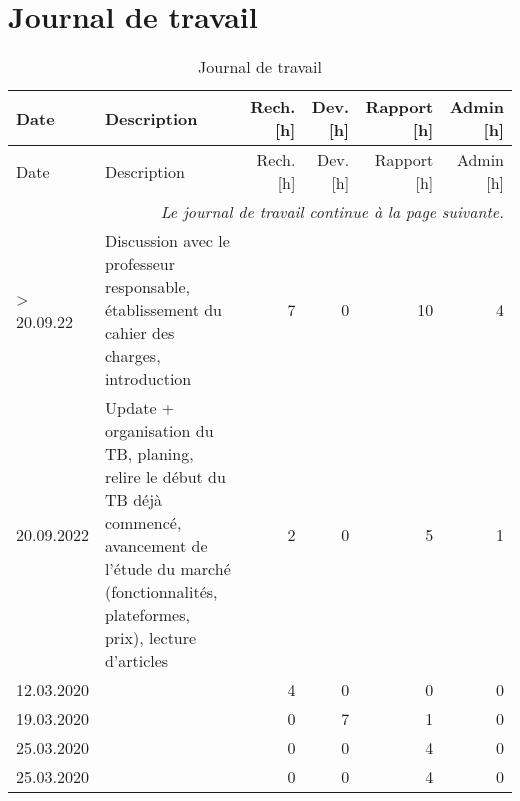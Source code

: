 

\chapter{Journal de travail}

\begin{landscape}

\begin{longtable}[c]{lp{10cm}rrrr}
    \caption{Journal de travail}\\

    \hline
    Date & Description & Rech. [h] & Dev. [h] & Rapport [h] & Admin [h] \\
    \hline
    \endfirsthead
    
    \hline
    Date & Description & Rech. [h] & Dev. [h] & Rapport [h] & Admin [h] \\
    \hline
    \endhead
    
    \multicolumn{6}{r}{\small \it Le journal de travail continue à la page suivante.} \\
    \normalsize
    \endfoot
    
    \hline
    \endlastfoot


    > 20.09.22
    & Discussion avec le professeur responsable, établissement du cahier des charges, introduction
    & 7 %
    & 0 %
    & 10 %
    & 4\\ %
    
	20.09.2022 
	& Update + organisation du TB, planing, relire le début du TB déjà commencé, avancement de l’étude du marché (fonctionnalités, plateformes, prix), lecture d’articles
	& 2 %
	& 0 %
	& 5 %
	& 1\\ %

	12.03.2020 
	&
	& 4 %
	& 0 %
	& 0 %
	& 0\\ %

	19.03.2020 
	& 
	& 0 %
	& 7 %
	& 1 %
	& 0\\ %

	25.03.2020 
	& 
	& 0 %
	& 0 %
	& 4 %
	& 0\\ %

	25.03.2020 
	& 
	& 0 %
	& 0 %
	& 4 %
	& 0\\ %
	

\end{longtable}
\end{landscape}
